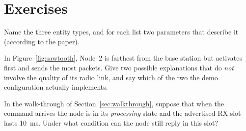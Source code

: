 \section*{Exercises}
\begin{exercise}
Name the three entity types, and for each list two parameters that describe it (according to the paper).
\end{exercise}
\begin{exercise}
In Figure~\ref{fig:sawtooth}, Node~2 is farthest from the base station but activates first and sends the most packets. Give two possible explanations that do \emph{not} involve the quality of its radio link, and say which of the two the demo configuration actually implements.
\end{exercise}
\begin{exercise}
In the walk-through of Section~\ref{sec:walkthrough}, suppose that when the command arrives the node is in its \emph{processing} state and the advertised RX slot lasts \SI{10}{ms}. Under what condition can the node still reply in this slot?
\end{exercise}
